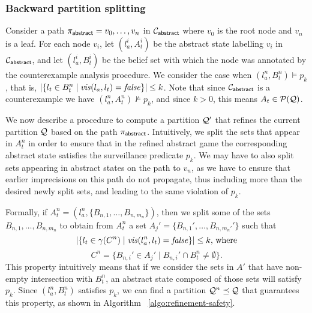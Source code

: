 \subsubsection{Backward partition splitting}
Consider a path $\pi_{\mathsf{abstract}} = v_0,\ldots, v_n$ in $\mathcal{C}_{\mathsf{abstract}}$ where $v_0$ is the root node and $v_n$ is a leaf. For each node $v_i$, let $(l_a^i,A_t^i) $ be the abstract state labelling $v_i$ in $\mathcal{C}_{\mathsf{abstract}}$, and let $(l_a^i,B_t^i)$ be the  belief set with which the node was annotated by the counterexample analysis procedure. We consider the case when $(l_a^n,B_t^n) \models p_k$, that is, $|\{l_t \in B_t^n \mid \mathit{vis}(l_a,l_t) = \mathit{false}\}| \leq k$.
Note that since $\mathcal{C}_{\mathsf{abstract}}$ is a counterexample we have $(l_a^n,A_t^n) \not \models p_k$, and since $k>0$, this means $A_t \in \mathcal{P}(\mathcal{Q})$.


We now describe a procedure to compute a partition $\mathcal{Q}'$ that refines the current partition $\mathcal{Q}$ based on the path $\pi_{\mathsf{abstract}}$. Intuitively, we split the sets that appear in $A_t^n$ in order to ensure that in the refined abstract game the corresponding abstract state satisfies the surveillance predicate $p_k$. We may have to also split sets appearing in abstract states on the path to $v_n$, as we have to ensure that earlier imprecisions on this path do not propagate, thus including more than the desired newly split sets, and leading to the same violation of $p_k$.

Formally, if $A_t^n = (l_a^n,\{B_{n,1},\ldots,B_{n,m_n}\})$, then we split some of the sets $B_{n,1},\ldots,B_{n,m_n}$ to obtain from $A_t^n$ a set $A_j' = \{B_{n,1}',\ldots,B_{n,m_n'}'\}$ such that
\[|\{l_t \in \gamma(C^n) \mid \mathit{vis}(l_a^n,l_t) = \mathit{false}\}| \leq k \text{, where}\] 
\[C^n = \{B_{n,i}' \in A_j' \mid B_{n,i}' \cap B_t^n \neq \emptyset\}.\]
This property intuitively means that if we consider the sets in $A'$ that have non-empty intersection with $B_t^n$, an abstract state composed of those sets will satisfy $p_k$. Since $(l_a^n,B_t^n)$ satisfies $p_k$, we can find a partition $\mathcal{Q}^n \preceq \mathcal{Q}$ that guarantees this property, as shown in Algorithm ~\ref{algo:refinement-safety}.
 
